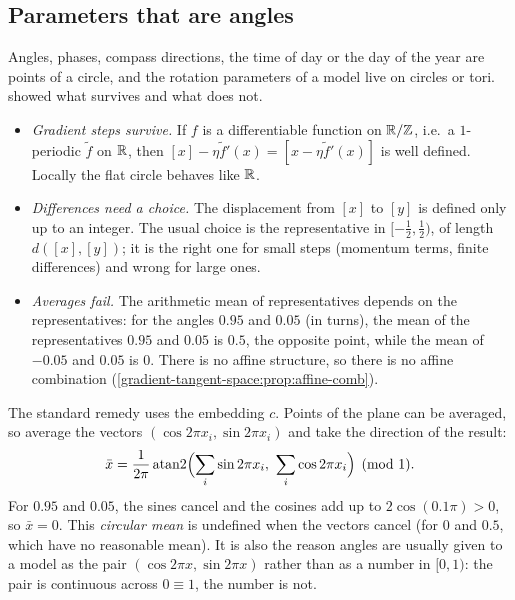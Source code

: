 \begin{notechapter}
\section{Parameters that are angles}

Angles, phases, compass directions, the time of day or the day of the year are points of a circle,
and the rotation parameters of a model live on circles or tori. 
showed what survives and what does not.
\begin{itemize}
  \item \emph{Gradient steps survive.} If $f$ is a differentiable function on $\mathbb{R}/\mathbb{Z}$, i.e.\ a $1$-periodic $\tilde f$ on
        $\mathbb{R}$, then $[x] - \eta\tilde f'(x) = [x - \eta\tilde f'(x)]$ is well defined. Locally the flat circle behaves like $\mathbb{R}$.
  \item \emph{Differences need a choice.} The displacement from $[x]$ to $[y]$ is defined only up to an
        integer. The usual choice is the representative in $[-\frac12, \frac12)$, of length $d([x], [y])$; it is
        the right one for small steps (momentum terms, finite differences) and wrong for large ones.
  \item \emph{Averages fail.} The arithmetic mean of representatives depends on the representatives:
        for the angles $0.95$ and $0.05$ (in turns), the mean of the representatives $0.95$ and $0.05$ is $0.5$,
        the opposite point, while the mean of $-0.05$ and $0.05$ is $0$. There is no affine structure, so
        there is no affine combination (\cref{gradient-tangent-space:prop:affine-comb}).
\end{itemize}
The standard remedy uses the embedding $c$. Points of the plane can be averaged, so average the
vectors $(\cos2\pi x_i, \sin2\pi x_i)$ and take the direction of the result:
\[
  \bar x = \frac1{2\pi}\operatorname{atan2}\Bigl(\sum_i\sin2\pi x_i,\ \sum_i\cos2\pi x_i\Bigr)\pmod 1 .
\]
For $0.95$ and $0.05$, the sines cancel and the cosines add up to $2\cos(0.1\pi)>0$, so $\bar x = 0$. This
\emph{circular mean} is undefined when the vectors cancel (for $0$ and $0.5$, which have no reasonable
mean). It is also the reason angles are usually given to a model as the pair $(\cos2\pi x, \sin2\pi x)$
rather than as a number in $[0, 1)$: the pair is continuous across $0\equiv1$, the number is not.


\end{notechapter}
